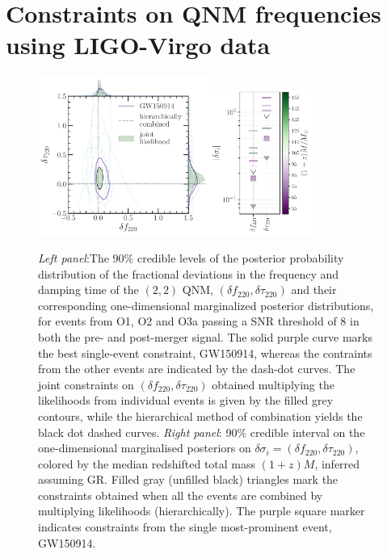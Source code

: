 \documentclass[twocolumn,prd,aps,superscriptaddress,preprintnumbers,tightenlines,showpacs,nofootinbib,eqsecnum,amsfonts,amsmath]{revtex4-1}
\newcommand{\df}[1]{\delta f_{\text{#1}}}
\newcommand{\dtau}[1]{\delta \tau_{\text{#1}}}
\begin{document}
\section{Constraints on QNM frequencies using LIGO-Virgo data}
\label{sec:results_lvc}
\begin{figure}
        \includegraphics[width=0.5\textwidth]{figures/rin_pseob_results_v2.pdf}\includegraphics[width=0.3\textwidth]{figures/rin_all_events_bounds.pdf}
        \caption{\emph{Left panel}:The 90\% credible levels of the posterior probability distribution of the fractional deviations in the frequency and damping time of the $(2, 2)$ QNM, $(\df{220},\dtau{220})$ and their corresponding one-dimensional marginalized posterior distributions, for events from O1, O2 and O3a passing a SNR threshold of $8$ in both the pre- and post-merger signal. The solid purple curve marks the best single-event constraint, GW150914, whereas the contraints from the other events are indicated by the dash-dot curves. The joint constraints on $(\df{220},\dtau{220})$ obtained multiplying the likelihoods from individual events is given by the filled grey contours, while the hierarchical method of combination yields the black dot dashed curves. \emph{Right panel}: 90\% credible interval on the one-dimensional marginalised posteriors on $\delta \sigma_i=(\df{220},\dtau{220})$, colored by the median redshifted total mass $(1 + z)M$, inferred assuming GR. Filled gray (unfilled black) triangles mark the constraints obtained when all the events are combined by multiplying likelihoods (hierarchically). The purple square marker indicates constraints from the single most-prominent event, GW150914.}
        \label{fig:o1o2_events}
\end{figure}
\end{document}
